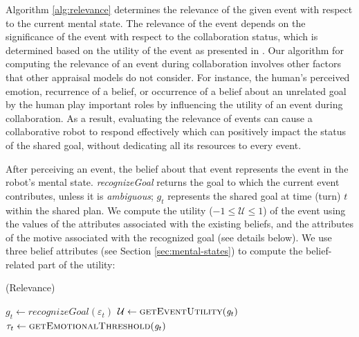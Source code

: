 \documentclass[12pt]{report}
\begin{document}
Algorithm \ref{alg:relevance} determines the relevance of the given event with
respect to the current mental state. The relevance of the event depends on the
significance of the event with respect to the collaboration status, which is
determined based on the utility of the event as presented in
\cite{gratch:domain-independent,marsella:ema-process-model}. Our algorithm for
computing the relevance of an event during collaboration involves other factors
that other appraisal models do not consider. For instance, the human's
perceived emotion, recurrence of a belief, or occurrence of a belief about an
unrelated goal by the human play important roles by influencing the utility
of an event during collaboration. As a result, evaluating the relevance of
events can cause a collaborative robot to respond effectively which can
positively impact the status of the shared goal, without dedicating all its
resources to every event.

After perceiving an event, the belief about that event represents the event in
the robot's mental state. \textit{recognizeGoal} returns the goal to which the
current event contributes, unless it is \textit{ambiguous}; $g_{t}$ represents
the shared goal at time (turn) $t$ within the shared plan. We compute the
utility ($-1 \leq \mathcal{U} \leq 1$) of the event using the values of the
attributes associated with the existing beliefs, and the attributes of the
motive associated with the recognized goal (see details below). We use three
belief attributes (see Section \ref{sec:mental-states}) to compute the
belief-related part of the utility:

\begin{algorithm}
	\caption{(Relevance)}
	\label{alg:relevance}
	\begin{algorithmic}[1]
 			\Statex
			\State $\mathit{g}_{t} \gets \textit{recognizeGoal}{(\varepsilon_t)}$
 			\Statex
			\State $\mathcal{U} \gets \Call{getEventUtility}{\mathit{g}_{t}}$ 
			\State $\tau_{t} \gets \Call{getEmotionalThreshold}{\mathit{g}_{t}}$
 			\Statex
 				\State {}
			\Else 
 				\State {}
			\EndIf
		\EndFunction
	\end{algorithmic}
\end{algorithm}
\end{document}
